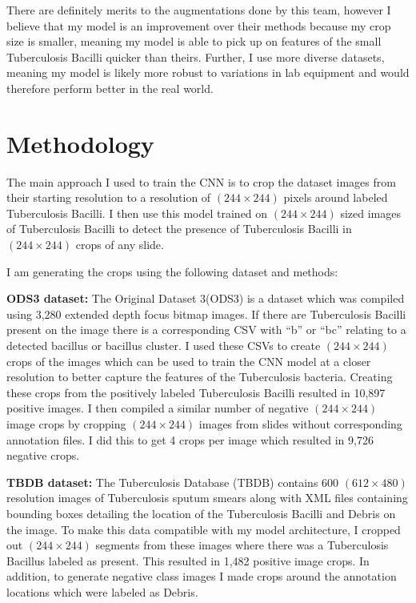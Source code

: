 \documentclass{article}
\begin{document}
There are definitely merits to the augmentations done by this team, however I believe that my model is an improvement over their methods
because my crop size is smaller, meaning my model is able to pick up on features of the small Tuberculosis Bacilli quicker than theirs.
Further, I use more diverse datasets, meaning my model is likely more robust to variations in lab equipment and would therefore perform
better in the real world.





\section{Methodology}

The main approach I used to train the CNN is to crop the dataset images from their starting resolution to a resolution
of $(244 \times 244)$ pixels around labeled Tuberculosis Bacilli. I then use this model trained on $(244 \times 244)$
sized images of Tuberculosis Bacilli to detect the presence of Tuberculosis Bacilli in $(244 \times 244)$ crops of any slide.

I am generating the crops using the following dataset and methods:

\textbf{ODS3 dataset:}
The Original Dataset 3(ODS3)\cite{Costa2025} is a dataset which was compiled using 3,280 extended depth focus bitmap images. If there are
Tuberculosis Bacilli present on the image there is a corresponding CSV with ``b'' or ``bc'' relating to a detected bacillus
or bacillus cluster. I used these CSVs to create $(244 \times 244)$ crops of the images which can be used to train the CNN model
at a closer resolution to better capture the features of the Tuberculosis bacteria. Creating these crops from the positively labeled
Tuberculosis Bacilli resulted in 10,897 positive images. I then compiled a similar number of negative $(244 \times 244)$ image crops by
cropping $(244 \times 244)$ images from slides without corresponding annotation files. I did this to get 4 crops per image which resulted
in 9,726 negative crops.


\textbf{TBDB dataset:}
The Tuberculosis Database (TBDB)\cite{TBDB} contains 600 $(612 \times 480)$ resolution images of Tuberculosis sputum smears along with
XML files containing bounding boxes detailing the location of the Tuberculosis Bacilli and Debris on the image. To make this data
compatible with my model architecture, I cropped out $(244 \times 244)$ segments from these images where there was a Tuberculosis
Bacillus labeled as present. This resulted in 1,482 positive image crops. In addition, to generate negative class images I 
made crops around the annotation locations which were labeled as Debris. 
\end{document}
